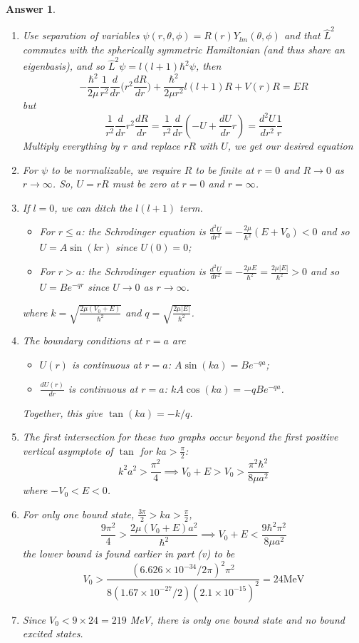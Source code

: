 \documentclass[a4paper]{article}
\newtheorem{ans}{Answer}[subsection]
\theoremstyle{new}
\begin{document}
\begin{ans}\leavevmode
\begin{enumerate}[label=(\roman*)]
\item Use separation of variables $\psi(r,\theta,\phi)=R(r)Y_{lm}(\theta,\phi)$ and that $\hat{L}^2$ commutes with the spherically symmetric Hamiltonian (and thus share an eigenbasis), and so $\hat{L}^2\psi=l(l+1)\hbar^2\psi$, then
$$-\frac{\hbar^2}{2\mu}\frac{1}{r^2}\frac{d}{dr}\bigg(r^2\frac{dR}{dr}\bigg)+\frac{\hbar^2}{2\mu r^2}l(l+1)R+V(r)R=ER$$
but 
$$\frac{1}{r^2}\frac{d}{dr}r^2\frac{dR}{dr}=\frac{1}{r^2}\frac{d}{dr}(-U+\frac{dU}{dr}r)=\frac{d^2U}{dr^2}\frac{1}{r}$$
Multiply everything by $r$ and replace $rR$ with $U$, we get our desired equation
\item For $\psi$ to be normalizable, we require $R$ to be finite at $r=0$ and $R\rightarrow 0$ as $r\rightarrow\infty$. So, $U=rR$ must be zero at $r=0$ and $r=\infty$.
\item If $l=0$, we can ditch the $l(l+1)$ term.
\begin{itemize}
    \item For $r\leq a$: the Schrodinger equation is $\frac{d^2U}{dr^2}=-\frac{2\mu}{\hbar^2}(E+V_0)<0$ and so $U=A\sin(kr)$ since $U(0)=0$;
    \item For $r>a$: the Schrodinger equation is $\frac{d^2U}{dr^2}=-\frac{2\mu E}{\hbar^2}=\frac{2\mu|E|}{\hbar^2}>0$ and so $U=Be^{-qr}$ since $U\rightarrow 0$ as $r\rightarrow\infty$.
\end{itemize}
where $k=\sqrt{\frac{2\mu(V_0+E)}{\hbar^2}}$ and $q=\sqrt{\frac{2\mu|E|}{\hbar^2}}$.
\item The boundary conditions at $r=a$ are
\begin{itemize}
    \item $U(r)$ is continuous at $r=a$: $A\sin(ka)=Be^{-qa}$;
    \item $\frac{dU(r)}{dr}$ is continuous at $r=a$: $kA\cos(ka)=-qBe^{-qa}$.
\end{itemize}
Together, this give $\tan(ka)=-k/q$.
\item The first intersection for these two graphs occur beyond the first positive vertical asymptote of $\tan$ for $ka>\frac{\pi}{2}$:
$$k^2a^2>\frac{\pi^2}{4}\implies V_0+E>V_0>\frac{\pi^2\hbar^2}{8\mu a^2}$$
where $-V_0<E<0$.
\item For only one bound state, $\frac{3\pi}{2}>ka>\frac{\pi}{2}$,
$$\frac{9\pi^2}{4}>\frac{2\mu(V_0+E)a^2}{\hbar^2}\implies V_0+E<\frac{9\hbar^2\pi^2}{8\mu a^2}$$
the lower bound is found earlier in part (v) to be $$V_0>\frac{(6.626\times10^{-34}/2\pi)^2\pi^2}{8(1.67\times10^{-27}/2)(2.1\times10^{-15})^2}=24 \text{MeV}$$
\item Since $V_0<9\times 24=219$ MeV, there is only one bound state and no bound excited states. 
\end{enumerate}
\end{ans}
\end{document}
